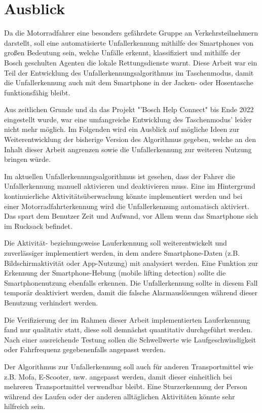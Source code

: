 \chapter{Ausblick}

Da die Motorradfahrer eine besonders gefährdete Gruppe an Verkehrsteilnehmern darstellt, soll eine automatisierte Unfallerkennung mithilfe des Smartphones von großen Bedeutung sein, welche Unfälle erkennt, klassifiziert und mithilfe der Bosch geschulten Agenten die lokale Rettungsdienste warnt. Diese Arbeit war ein Teil der Entwicklung des Unfallerkennungsalgorithmus im Taschenmodus, damit die Unfallerkennung auch mit dem Smartphone in der Jacken- oder Hosentasche funktionsfähig bleibt.

Aus zeitlichen Grunde und da das Projekt "'Bosch Help Connect" bis Ende 2022 eingestellt wurde, war eine umfangreiche Entwicklung des Taschenmodus' leider nicht mehr möglich.
Im Folgenden wird ein Ausblick auf mögliche Ideen zur Weiterentwicklung der bisherige Version des Algorithmus gegeben, welche an den Inhalt dieser Arbeit angrenzen sowie die Unfallerkennung zur weiteren Nutzung bringen würde.

Im aktuellen Unfallerkennungsalgorithmus ist gesehen, dass der Fahrer die Unfallerkennung manuell aktivieren und deaktivieren muss. Eine im Hintergrund kontinuierliche Aktivitätsüberwachung könnte implementiert werden und bei einer Motorradfahrterkennung wird die Unfallerkennung automatisch aktiviert. Das spart dem Benutzer Zeit und Aufwand, vor Allem wenn das Smartphone sich im Rucksack befindet. %

Die Aktivität- beziehungsweise Lauferkennung soll weiterentwickelt und zuverlässiger implementiert werden, in dem andere Smartphone-Daten (z.B. Bildschirmaktivität oder App-Nutzung) mit analysiert werden.
Eine Funktion zur Erkennung der Smartphone-Hebung (mobile lifting detection) sollte die Smartphonenutzung ebenfalls erkennen. Die Unfallerkennung sollte in diesem Fall temporär deaktiviert werden, damit die falsche Alarmauslösungen während dieser Benutzung verhindert werden.

Die Verifizierung der im Rahmen dieser Arbeit implementierten Lauferkennung fand nur qualitativ statt, diese soll demnächst quantitativ durchgeführt werden. Nach einer ausreichende Testung sollen die Schwellwerte wie Laufgeschwindigkeit oder Fahrfrequenz gegebenenfalls angepasst werden.

Der Algorithmus zur Unfallerkennung soll auch für anderen Transportmittel wie z.B. Mofa, E-Scooter, usw. angepasst werden, damit dieser einheitlich bei mehreren Transportmittel verwendbar bleibt. Eine Sturzerkennung der Person während des Laufen oder der anderen alltäglichen Aktivitäten könnte sehr hilfreich sein.

